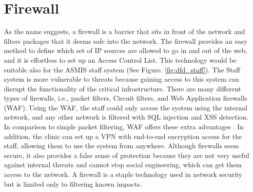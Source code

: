 \section{Firewall}
As the name suggests, a firewall is a barrier that sits in front of the network and filters packages that it deems safe into the network. The firewall provides an easy method to define which set of IP sources are allowed to go in and out of the web, and it is effortless to set up an Access Control List. This technology would be suitable also for the ASMIS staff system (See Figure. \ref{fig:dfd_staff}). The Staff system is more vulnerable to threats because gaining access to this system can disrupt the functionality of the critical infrastructure.\newline\newline
There are many different types of firewalls, i.e., packet filters, Circuit filters, and Web Application firewalls (WAF). Using the WAF, the staff could only access the system using the internal network, and any other network is filtered with SQL injection and XSS detection. In comparison to simple packet filtering, WAF offers these extra advantages \citep[p.~354]{thang2020improving}. In addition, the clinic can set up a VPN with end-to-end encryption access for the staff, allowing them to use the system from anywhere.\newline\newline
Although firewalls seem secure, it also provides a false sense of protection because they are not very useful against internal threats and cannot stop social engineering, which can get them access to the network. A firewall is a staple technology used in network security but is limited only to filtering known impacts.
